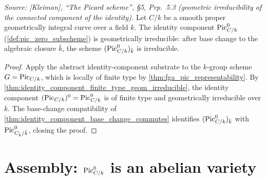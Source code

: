 \begin{theorem}\leanok
  \label{thm:pic0_geom_irred}

  \textit{Source: [Kleiman], ``The Picard scheme'', \S 5, Prp.~5.3
  (geometric irreducibility of the connected component of the
  identity).}
  Let \(C/k\) be a smooth proper geometrically integral curve over a
  field \(k\). The identity component \(\operatorname{Pic}^0_{C/k}\)
  (\cref{def:pic_zero_subscheme}) is geometrically irreducible: after
  base change to the algebraic closure \(\bar k\), the scheme
  \((\operatorname{Pic}^0_{C/k})_{\bar k}\) is irreducible.
\end{theorem}

\begin{proof}\leanok
  Apply the abstract identity-component substrate to the \(k\)-group
  scheme \(G = \operatorname{Pic}_{C/k}\), which is locally of finite type by
  \cref{thm:fga_pic_representability}. By
  \cref{thm:identity_component_finite_type_geom_irreducible}, the
  identity component \((\operatorname{Pic}_{C/k})^0 = \operatorname{Pic}^0_{C/k}\) is of finite
  type and geometrically irreducible over \(k\). The base-change
  compatibility of
  \cref{thm:identity_component_base_change_commutes} identifies
  \((\operatorname{Pic}^0_{C/k})_{\bar k}\) with \(\operatorname{Pic}^0_{C_{\bar k}/\bar k}\),
  closing the proof.
\end{proof}

\section{Assembly: \(\operatorname{Pic}^0_{C/k}\) is an abelian variety}
\label{sec:pic0_isAbelianVariety}

